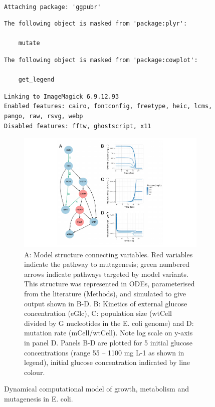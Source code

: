 \documentclass[
  12pt,
  letterpaper,
  DIV=11,
  numbers=noendperiod]{scrreprt}
\begin{document}
\begin{figure}

{\centering 

\begin{verbatim}

Attaching package: 'ggpubr'
\end{verbatim}

\begin{verbatim}
The following object is masked from 'package:plyr':

    mutate
\end{verbatim}

\begin{verbatim}
The following object is masked from 'package:cowplot':

    get_legend
\end{verbatim}

\begin{verbatim}
Linking to ImageMagick 6.9.12.93
Enabled features: cairo, fontconfig, freetype, heic, lcms, pango, raw, rsvg, webp
Disabled features: fftw, ghostscript, x11
\end{verbatim}

\begin{figure}

{\centering \includegraphics{Chap2PBio_files/figure-pdf/fig-one-1.pdf}

}

\caption{A: Model structure connecting variables. Red variables indicate
the pathway to mutagenesis; green numbered arrows indicate pathways
targeted by model variants. This structure was represented in ODEs,
parameterised from the literature (Methods), and simulated to give
output shown in B-D. B: Kinetics of external glucose concentration
(eGlc), C: population size (wtCell divided by G nucleotides in the E.
coli genome) and D: mutation rate (mCell/wtCell). Note log scale on
y-axis in panel D. Panels B-D are plotted for 5 initial glucose
concentrations (range 55 -- 1100 mg L-1 as shown in legend), initial
glucose concentration indicated by line colour.}

\end{figure}

}

\caption{\label{fig-one}Dynamical computational model of growth,
metabolism and mutagenesis in E. coli.}

\end{figure}
\end{document}
